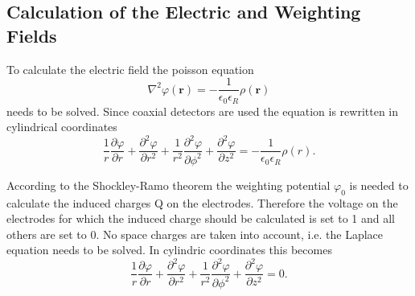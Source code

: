 \subsection{Calculation of the Electric and Weighting Fields} 
\label{sec:field}
To calculate the electric field the poisson equation 
\begin{equation}
\nabla^{2} \varphi(\textbf{r}) = -\frac{1}{\epsilon_{0} \epsilon_{R}} \rho(\textbf{r})
\label{eq:poisson}
\end{equation} 
needs to be solved. Since coaxial detectors are used
the equation is rewritten in cylindrical coordinates 
\begin{equation}
\frac{1}{r} \frac{\partial \varphi}{\partial r} + \frac{\partial^{2} \varphi}{\partial r^{2}} + \frac{1}{r^{2}} \frac{\partial^{2} \varphi}{\partial \phi^{2}} +
\frac{\partial^{2} \varphi}{\partial z^{2}} = - \frac{1}{\epsilon_{0}
\epsilon_{R}} \rho(r).
\label{eq:poisson_cyl}
\end{equation}

According to the Shockley-Ramo theorem the weighting potential
$\varphi_{0}$ is needed to calculate the induced charges Q on the
electrodes. Therefore the voltage on the electrodes for which the
induced charge should be calculated is set to 1 and all others are set
to 0. No space charges are taken into account, i.e. the Laplace equation
needs to be solved. In cylindric coordinates this becomes 
\begin{equation}
\frac{1}{r}
\frac{\partial \varphi}{\partial r} + \frac{\partial^{2} \varphi}{\partial
r^{2}} + \frac{1}{r^{2}} \frac{\partial^{2} \varphi}{\partial \phi^{2}} +
\frac{\partial^{2} \varphi}{\partial z^{2}} = 0.
\label{eq:laplace}
\end{equation}

